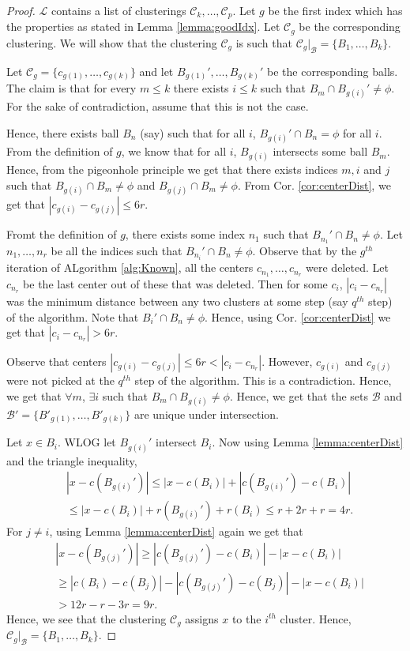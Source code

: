 \documentclass[twoside]{article}
\newcommand{\mc}{\mathcal}
\begin{document}
\begin{proof}
$\mc L$ contains a list of clusterings $\mc C_k,\ldots,\mc C_p$. Let $g$ be the first index which has the properties as stated in Lemma \ref{lemma:goodIdx}. Let $\mc C_g$ be the corresponding clustering. We will show that the clustering $\mc C_g$ is such that $\mc C_g|_{\mc B} = \{B_1,\ldots,B_k\}$. 

Let $\mc C_g = \{c_{g(1)},\ldots,c_{g(k)}\}$ and let $B_{g(1)}',\ldots,B_{g(k)}'$ be the corresponding balls. The claim is that for every $m \le k$ there exists $i \le k$ such that $B_m \cap B_{g(i)}' \neq \phi$. For the sake of contradiction, assume that this is not the case. 

Hence, there exists ball $B_n$ (say) such that for all $i$, $B_{g(i)}' \cap B_n = \phi$ for all $i$. From the definition of $g$, we know that for all $i$, $B_{g(i)}$ intersects some ball $B_m$. Hence, from the pigeonhole principle we get that there exists indices $m, i$ and $j$ such that $B_{g(i)} \cap B_m \neq \phi$ and $B_{g(j)} \cap B_m \neq \phi$. From Cor. \ref{cor:centerDist}, we get that $|c_{g(i)}-c_{g(j)}| \le 6r$.

Fromt the definition of $g$, there exists some index $n_1$ such that $B_{n_1}' \cap B_n \neq \phi$. Let $n_1, \ldots, n_r$ be all the indices such that $B_{n_i}' \cap B_n \neq \phi$. Observe that by the $g^{th}$ iteration of ALgorithm \ref{alg:Known}, all the centers $c_{n_1}, \ldots, c_{n_r}$ were deleted. Let $c_{n_r}$ be the last center out of these that was deleted. Then for some $c_i$, $|c_i - c_{n_r}|$ was the minimum distance between any two clusters at some step (say $q^{th}$ step) of the algorithm. Note that $B_i' \cap B_n \neq \phi$. Hence, using Cor. \ref{cor:centerDist} we get that $|c_i - c_{n_r}| > 6r$. 

Observe that centers $|c_{g(i)}-c_{g(j)}| \le 6r < |c_i - c_{n_r}|$. However, $c_{g(i)}$ and $c_{g(j)}$ were not picked at the $q^{th}$ step of the algorithm. This is a contradiction. Hence, we get that $\forall m$, $\exists i$ such that $B_m \cap B_{g(i)} \neq \phi$. Hence, we get that the sets $\mc B$ and $\mc B' = \{B'_{g(1)}, \ldots, B'_{g(k)}\}$ are unique under intersection.

Let $x \in B_i$. WLOG let $B_{g(i)}'$ intersect $B_i$. Now using Lemma \ref{lemma:centerDist} and the triangle inequality,
\begin{align*}
&|x-c(B_{g(i)}')| \le |x-c(B_i)| + |c(B_{g(i)}')-c(B_i)| \\
&\le |x-c(B_i)| + r(B_{g(i)}')+ r(B_i) \le r+ 2r + r = 4r.
\end{align*} 
For $j \neq i$, using Lemma \ref{lemma:centerDist} again we get that
\begin{align*} 
&|x-c(B_{g(j)}')| \ge |c(B_{g(j)}')-c(B_i)| - |x-c(B_i)|\\
& \ge |c(B_i)-c(B_j)| - |c(B_{g(j)}')-c(B_j)| - |x-c(B_i)| \\
&> 12r - r -3r = 9r.
\end{align*} 
Hence, we see that the clustering $\mc C_g$ assigns $x$ to the $i^{th}$ cluster. Hence, $\mc C_g|_\mc B = \{B_1,\ldots,B_k\}$.
 

\end{proof}
\end{document}
